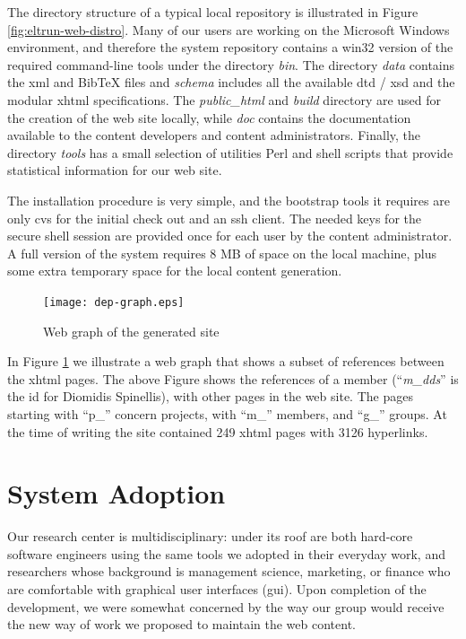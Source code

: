 \documentclass{elsart}
\begin{document}
The directory structure of a typical 
local repository is illustrated in Figure \ref{fig:eltrun-web-distro}.
Many of our users are working on the Microsoft Windows environment, and
therefore the system repository contains a {\sc win32} version of the required
command-line tools under the directory \textit{bin}.
The directory \textit{data} contains the {\sc xml} and {\sc BibTeX} files and \textit{schema}
includes all the available {\sc dtd / xsd} and the modular {\sc xhtml} specifications.
The \textit{public\_html} and \textit{build} directory are used for the creation of the 
web site locally, while \textit{doc} contains the documentation available to
the content developers and content administrators.
Finally, the directory \textit{tools} has a small selection 
of utilities Perl and shell scripts that provide statistical information
for our web site.

The installation procedure is very simple,
and the bootstrap tools it requires are only {\sc cvs} for 
the initial check out and an {\sc ssh} client. The needed keys 
for the secure shell session are provided once for each user by the content administrator. 
A full version of the system requires 8 MB of space 
on the local machine, plus some extra temporary space for the local content generation.

\begin{figure}
\texttt{[image: dep-graph.eps]}
\caption{Web graph of the generated site}
\label{fig:eltrun-web-m-dds-snapshot}
\end{figure}

In Figure \ref{fig:eltrun-web-m-dds-snapshot} we illustrate a web graph \cite{KRRSTU00} 
that shows a subset of references between the {\sc xhtml} pages.
The above Figure shows the references  of a member (``\textit{m\_dds}'' is the {\sc id} for 
Diomidis Spinellis), with other pages in the web site.
The pages starting with ``p\_'' concern projects, with ``m\_'' members, and ``g\_'' groups.
At the time of writing the site contained 249 {\sc xhtml} pages with 3126 hyperlinks. 

\section{System Adoption}
\label{sec:adopt}

Our research center is multidisciplinary: under its roof
are both hard-core software engineers using the same tools
we adopted in their everyday work, and researchers whose
background is management science, marketing, or finance
who are comfortable with graphical user interfaces ({\sc gui}).
Upon completion of the development, we were somewhat concerned by the way our group
would receive the new way of work we proposed to maintain the web content.
\end{document}
